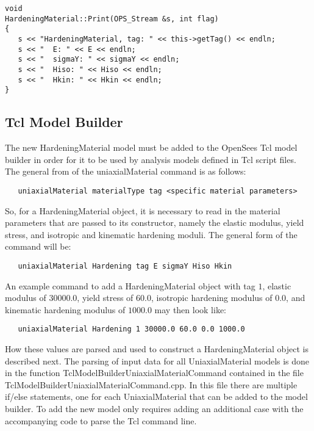 \documentclass[12pt]{article}
\begin{document}
{{\sf\small
\begin{verbatim}
void 
HardeningMaterial::Print(OPS_Stream &s, int flag)
{
   s << "HardeningMaterial, tag: " << this->getTag() << endln;
   s << "  E: " << E << endln;
   s << "  sigmaY: " << sigmaY << endln;
   s << "  Hiso: " << Hiso << endln;
   s << "  Hkin: " << Hkin << endln;
}
\end{verbatim}
}

\subsection{Tcl Model Builder}
The new HardeningMaterial model must be added to the OpenSees Tcl model builder in
order for it to be used by analysis models defined in Tcl script files. The general
from of the uniaxialMaterial command is as follows:

{\sf\small
\begin{verbatim}
   uniaxialMaterial materialType tag <specific material parameters>
\end{verbatim}
}

\noindent So, for a HardeningMaterial object, it is necessary to read in the material
parameters that are passed to its constructor, namely the elastic modulus, yield stress,
and isotropic and kinematic hardening moduli. The general form of the command will be:

{\sf\small
\begin{verbatim}
   uniaxialMaterial Hardening tag E sigmaY Hiso Hkin
\end{verbatim}
}

An example command to add a HardeningMaterial object with tag $1$, elastic modulus
of $30000.0$, yield stress of $60.0$, isotropic hardening modulus of $0.0$, and
kinematic hardening modulus of $1000.0$ may then look like:

{\sf\small
\begin{verbatim}
   uniaxialMaterial Hardening 1 30000.0 60.0 0.0 1000.0
\end{verbatim}
}

How these values are parsed and used to construct a HardeningMaterial object is
described next. The parsing of input data for all UniaxialMaterial models is done
in the function \p TclModelBuilderUniaxialMaterialCommand contained in the file
TclModelBuilderUniaxialMaterialCommand.cpp.
In this file there are multiple if/else statements, one for each UniaxialMaterial that
can be added to the model builder. To add the new model only requires adding an
additional case with the accompanying code to parse the Tcl command line.

}
\end{document}
